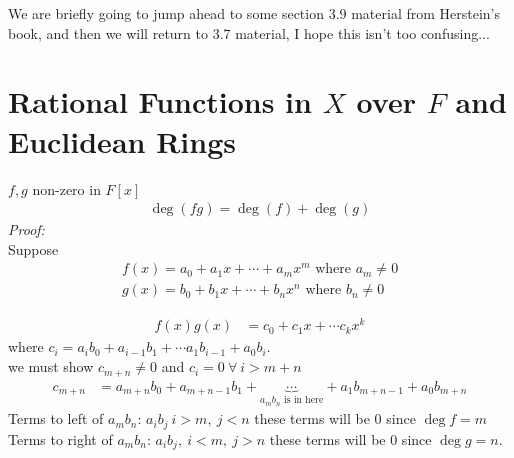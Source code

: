 \setcounter{section}{8}
\begin{tcolorbox}
    We are briefly going to jump ahead to some section 3.9 material from Herstein's book, and then we will return to 3.7 material, I hope this isn't too confusing...
\end{tcolorbox}
\section{Rational Functions in $X$ over $F$ and Euclidean Rings}
\begin{lemma}
    $f,g$ non-zero in $F[x]$
    \begin{align}
        \deg(fg)= \deg(f)+\deg(g) \nonumber
    \end{align}
    \textit{Proof:} \\
    \noindent Suppose 
    \begin{align}
        f(x)= a_0 +a_1x+\cdots + a_mx^m \text{ where } a_m \neq 0 \nonumber \\
        g(x)= b_0 +b_1x + \cdots + b_nx^n \text{ where } b_n\neq 0 \nonumber
    \end{align}

    \begin{align}
        f(x)g(x) &= c_0 + c_1x + \cdots c_kx^k \nonumber
    \end{align}
    where $c_i = a_ib_0 + a_{i-1}b_1 + \cdots a_1b_{i-1} + a_0 b_i$. \\
    \noindent we must show $c_{m+n}\neq 0$ and $c_i = 0 \ \forall \ i >m+n$
    \begin{align}
        c_{m+n} &= a_{m+n} b_0 + a_{m+n-1}b_1 + \underbrace{\cdots}_{a_mb_n \text{ is in here}}+ a_1b_{m+n-1}+a_0b_{m+n} \nonumber
    \end{align}
    Terms to left of $a_mb_n$: $a_ib_j \ i>m, \ j <n$ these terms will be $0$ since $\deg f = m$ \\
    \noindent Terms to right of $a_mb_n$: $a_ib_j, \ i<m, \ j>n$ these terms will be $0$ since $\deg g = n$. \\


\end{lemma}
